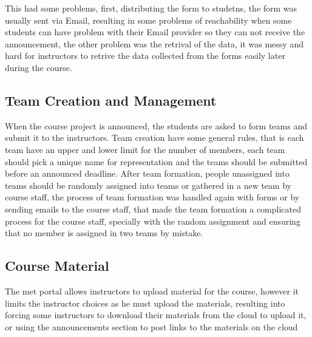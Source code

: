 \newParagraph
This had some problems, first, distributing the form to studetns, the form was usually sent via Email,
resulting in some problems of reachability when some students can have problem with their Email provider so they can not receive
the announcement, the other problem was the retrival of the data, it was messy and hard for instructors to retrive
the data collected from the forms easily later during the course.

\subsection{Team Creation and Management}
\label{sub:team-management}
When the course project is announced, the students are asked to form teams and submit it to the instructors. Team creation
have some general rules, that is each team have an upper and lower limit for the number of members, each team should pick
a unique name for representation and the teams should be submitted before an announced deadline. After team formation, people
unassigned into teams should be randomly assigned into teams or gathered in a new team by course staff, the process of team
formation was handled again with forms or by sending emails to the course staff, that made the team formation a complicated
process for the course staff, specially with the random assignment and ensuring that no member is assigned in two teams
by mistake.

\subsection{Course Material}
\label{sub:course-material}
The \ac{met} portal allows instructors to upload material for the course, however it limits the instructor choices as
he must upload the materials, resulting into forcing some instructors to download their materials from the cloud
to upload it, or using the announcements section to post links to the materials on the cloud
